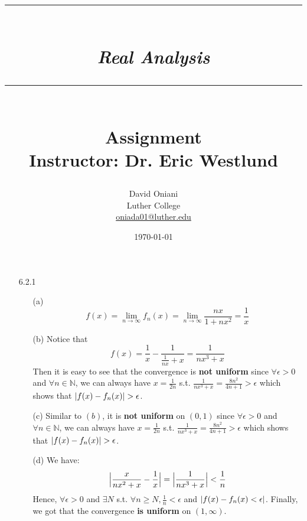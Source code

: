 \documentclass[11pt]{article}
\author{David Oniani\\
        Luther College\\
        \href{mailto:oniada01@luther.edu}{oniada01@luther.edu}}
\title{\rule{\paperwidth - 150pt}{1pt}\textbf{\\\textit{Real Analysis}\\}\rule
{\paperwidth - 150pt}{1pt}\\\textbf{Assignment \textnumero10}\\{\normalsize
Instructor: Dr. Eric Westlund}}
\date{\today}
\DeclarePairedDelimiter\abs{\lvert}{\rvert}%
\DeclarePairedDelimiter\absb{\Big\lvert}{\Big\rvert}%
\newcommand{\nats}{\mathbb{N}}
\begin{document}
\maketitle

%
%
%

\begin{itemize}
    \item[6.2.1]
        \begin{itemize}
            \item[(a)]
                \begin{equation*}
                    \boxed{f(x) = \lim_{n \to \infty}{f_n(x)}
                                = \lim_{n \to \infty}{\frac{nx}{1 + nx^2}}
                                = \frac{1}{x}}
                \end{equation*}

            \item[(b)]
                Notice that
                \begin{equation*}
                    f(x) = \frac{1}{x} - \frac{1}{\frac{1}{nx} + x}
                         = \frac{1}{nx^3 + x}
                \end{equation*}
                Then it is easy to see that the convergence is \textbf{not
                uniform} since $\forall \epsilon > 0$ and $\forall n \in
                \nats$, we can always have $x = \frac{1}{2n}$ s.t.
                $\frac{1}{nx^3 + x} = \frac{8n^2}{4n + 1} > \epsilon$ which
                shows that $\abs{f(x) - f_n(x)} > \epsilon$.

            \item[(c)]
                Similar to $(b)$, it is \textbf{not uniform} on $(0, 1)$ since
                $\forall \epsilon > 0$ and $\forall n \in \nats$, we can always
                have $x = \frac{1}{2n}$ s.t.  $\frac{1}{nx^3 + x} =
                \frac{8n^2}{4n + 1} > \epsilon$ which shows that $\abs{f(x) -
                f_n(x)} > \epsilon$.

            \item[(d)]
                We have:
                \begin{equation*}
                    \absb{\frac{x}{nx^2 + x} - \frac{1}{x}}
                        = \absb{\frac{1}{nx^3 + x}}
                        < \frac{1}{n}
                \end{equation*}
                Hence, $\forall \epsilon > 0$ and $\exists N$ s.t. $\forall n
                \geq N, \frac{1}{n} < \epsilon$ and $\abs{f(x) - f_n(x) <
                \epsilon}$. Finally, we got that the convergence \textbf{is
                uniform} on $(1, \infty)$.
        \end{itemize}


\end{itemize}
\end{document}
